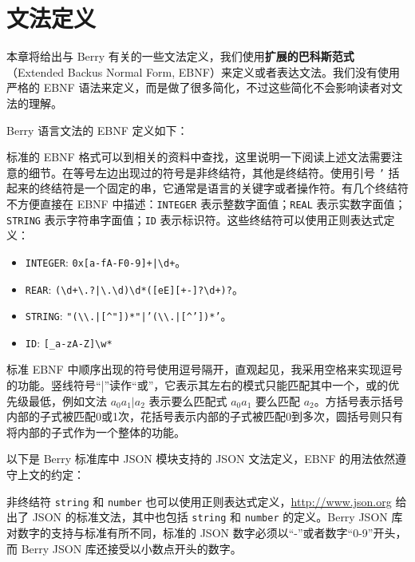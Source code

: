\chapter{文法定义}

本章将给出与 Berry 有关的一些文法定义，我们使用\textbf{扩展的巴科斯范式}（Extended Backus Normal Form, EBNF）来定义或者表达文法。我们没有使用严格的 EBNF 语法来定义，而是做了很多简化，不过这些简化不会影响读者对文法的理解。

Berry 语言文法的 EBNF 定义如下：



标准的 EBNF 格式可以到相关的资料中查找，这里说明一下阅读上述文法需要注意的细节。在等号左边出现过的符号是非终结符，其他是终结符。使用引号 \texttt{'} 括起来的终结符是一个固定的串，它通常是语言的关键字或者操作符。有几个终结符不方便直接在 EBNF 中描述：\texttt{INTEGER} 表示整数字面值；\texttt{REAL} 表示实数字面值；\texttt{STRING} 表示字符串字面值；\texttt{ID} 表示标识符。这些终结符可以使用正则表达式定义：

\begin{itemize}
    \item \texttt{INTEGER}: \texttt{0x[a-fA-F0-9]+|\textbackslash d+}。
    \item \texttt{REAR}: \texttt{(\textbackslash d+\textbackslash.?|\textbackslash.\textbackslash d)\textbackslash d*([eE][+-]?\textbackslash d+)?}。
    \item \texttt{STRING}: \texttt{"(\textbackslash\textbackslash.|[\textasciicircum"])*"|'(\textbackslash\textbackslash.|[\textasciicircum'])*'}。
    \item \texttt{ID}: \texttt{[\_a-zA-Z]\textbackslash w*}
\end{itemize}

标准 EBNF 中顺序出现的符号使用逗号隔开，直观起见，我采用空格来实现逗号的功能。竖线符号``|''读作``或''，它表示其左右的模式只能匹配其中一个，或的优先级最低，例如文法 $a_0a_1|a_2$ 表示要么匹配式 $a_0a_1$ 要么匹配 $a_2$。方括号表示括号内部的子式被匹配0或1次，花括号表示内部的子式被匹配0到多次，圆括号则只有将内部的子式作为一个整体的功能。

以下是 Berry 标准库中 JSON 模块支持的 JSON 文法定义，EBNF 的用法依然遵守上文的约定：



非终结符 \texttt{string} 和 \texttt{number} 也可以使用正则表达式定义，\url{http://www.json.org} 给出了 JSON 的标准文法，其中也包括 \texttt{string} 和 \texttt{number} 的定义。Berry JSON 库对数字的支持与标准有所不同，标准的 JSON 数字必须以``-''或者数字``0-9''开头，而 Berry JSON 库还接受以小数点开头的数字。

